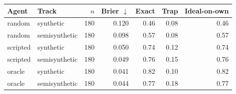 \begin{tabular}{llrrrrr}
\toprule
Agent & Track & $n$ & Brier $\downarrow$ & Exact & Trap & Ideal-on-own \\
\midrule
random & synthetic & 180 & 0.120 & 0.46 & 0.08 & 0.46 \\
random & semisynthetic & 180 & 0.098 & 0.57 & 0.08 & 0.57 \\
scripted & synthetic & 180 & 0.050 & 0.74 & 0.12 & 0.74 \\
scripted & semisynthetic & 180 & 0.049 & 0.76 & 0.15 & 0.76 \\
oracle & synthetic & 180 & 0.041 & 0.82 & 0.10 & 0.82 \\
oracle & semisynthetic & 180 & 0.044 & 0.77 & 0.18 & 0.77 \\
\bottomrule
\end{tabular}

